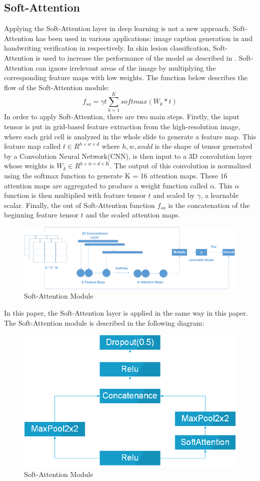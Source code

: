 \subsection{Soft-Attention}
Applying the Soft-Attention layer in deep learning is not a new approach. Soft-Attention has been used in various applications: image caption generation in \cite{03044} and handwriting verification in \cite{202017} respectively. In skin lesion classification, Soft-Attention is used to increase the performance of the model as described in \cite{03358}. Soft-Attention can ignore irrelevant areas of the image by multiplying the corresponding feature maps with low weights. The function below describes the flow of the Soft-Attention module:
\[
f_{sa} = \gamma t\sum_{k=1}^{K}softmax(W_k * t)
\]
In order to apply Soft-Attention, there are two main steps. Firstly, the input tensor is put in grid-based feature extraction from the high-resolution image, where each grid cell is analyzed in the whole slide to generate a feature map\cite{08513}. This feature map called $t \in R^{h \times w \times d}$ where $h, w, and d$ is the shape of tensor generated by a Convolution Neural Network(CNN), is then input to a 3D convolution layer whose weights is $W_k \in R^{h \times w \times d \times K}$. The output of this convolution is normalized using the softmax function to generate K = 16 attention maps. These $16$ attention maps are aggregated to produce a weight function called $\alpha$. This $\alpha$ function is then multiplied with feature tensor $t$ and scaled by $\gamma$, a learnable scalar. Finally, the out of Soft-Attention function $f_{sa}$ is the concatenation of the beginning feature tensor $t$ and the scaled attention maps. 
\begin{figure}[h]
	\centering
	\includegraphics[width=1\linewidth]{Diagram/SoftAttention}
	\caption{Soft-Attention Module}
	\label{fig:softattention}
\end{figure}
In this paper, the Soft-Attention layer is applied in the same way in this paper\cite{03358}. The Soft-Attention module is described in the following diagram:
\begin{figure}[h]
	\centering
	\includegraphics[width=0.5\linewidth]{Diagram/SoftAttentionBlock}
	\caption{Soft-Attention Module}
	\label{fig:softattentionblock}
\end{figure}\\


